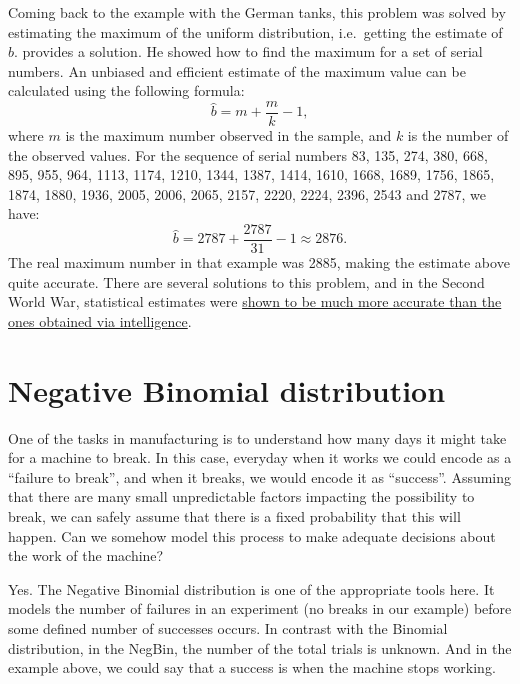 \documentclass[
]{book}
\theoremstyle{definition}
\theoremstyle{definition}
\theoremstyle{definition}
\theoremstyle{definition}
\theoremstyle{remark}
\begin{document}
Coming back to the example with the German tanks, this problem was solved by estimating the maximum of the uniform distribution, i.e.~getting the estimate of \(b\). \citet{Goodman1952} provides a solution. He showed how to find the maximum for a set of serial numbers. An unbiased and efficient estimate of the maximum value can be calculated using the following formula:
\begin{equation*}
    \hat{b} = m + \frac{m}{k}-1,
\end{equation*}
where \(m\) is the maximum number observed in the sample, and \(k\) is the number of the observed values. For the sequence of serial numbers \citep[from][]{Goodman1954} 83, 135, 274, 380, 668, 895, 955, 964, 1113, 1174, 1210, 1344, 1387, 1414, 1610, 1668, 1689, 1756, 1865, 1874, 1880, 1936, 2005, 2006, 2065, 2157, 2220, 2224, 2396, 2543 and 2787, we have:
\begin{equation*}
    \hat{b} = 2787 + \frac{2787}{31}-1 \approx 2876 .
\end{equation*}
The real maximum number in that example was 2885, making the estimate above quite accurate. There are several solutions to this problem, and in the Second World War, statistical estimates were \href{https://www.theguardian.com/world/2006/jul/20/secondworldwar.tvandradio}{shown to be much more accurate than the ones obtained via intelligence}.

\section{Negative Binomial distribution}\label{distributionNegBin}

One of the tasks in manufacturing is to understand how many days it might take for a machine to break. In this case, everyday when it works we could encode as a ``failure to break'', and when it breaks, we would encode it as ``success''. Assuming that there are many small unpredictable factors impacting the possibility to break, we can safely assume that there is a fixed probability that this will happen. Can we somehow model this process to make adequate decisions about the work of the machine?

Yes. The Negative Binomial distribution is one of the appropriate tools here. It models the number of failures in an experiment (no breaks in our example) before some defined number of successes occurs. In contrast with the Binomial distribution, in the NegBin, the number of the total trials is unknown. And in the example above, we could say that a success is when the machine stops working.
\end{document}
